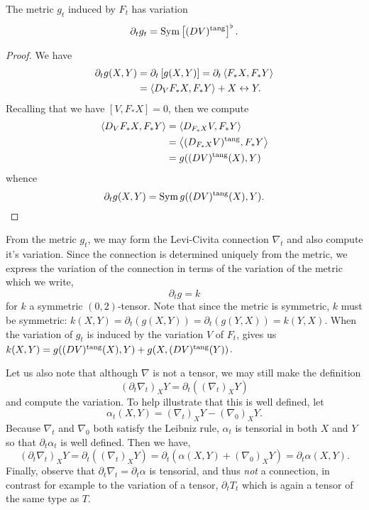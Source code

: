 \begin{lemma}
\label{lem:dt_g}
The metric \(g_t\) induced by \(F_t\) has variation
\[
\partial_t g_t = \operatorname{Sym} \left[(DV)^{\operatorname{tang}}\right]^{\flat}.
\]
\end{lemma}

\begin{proof}
We have
\[
\begin{split}
\partial_t g (X, Y) &= \partial_t \left[g(X, Y)\right] = \partial_t \left\langle F_{\ast} X,F_{\ast} Y \right\rangle \\
&= \left\langle D_V F_{\ast} X,F_{\ast} Y \right\rangle + X \leftrightarrow Y.
\end{split}
\]
Recalling that we have \([V, F_{\ast} X] = 0\), then we compute
\[
\begin{split}
\left\langle D_V F_{\ast} X,F_{\ast} Y \right\rangle &= \left\langle D_{F_{\ast} X} V,F_{\ast} Y \right\rangle \\
&= \left\langle (D_{F_{\ast} X} V)^{\operatorname{tang}},F_{\ast} Y \right\rangle \\
&= g((DV)^{\operatorname{tang}} (X), Y)
\end{split}
\]
whence
\[
\partial_t g (X, Y) = \operatorname{Sym} g((DV)^{\operatorname{tang}} (X), Y).
\]
\end{proof}

From the metric \(g_t\), we may form the Levi-Civita connection \(\nabla_t\) and also compute it's variation. Since the connection is determined uniquely from the metric, we express the variation of the connection in terms of the variation of the metric which we write,
\[
\partial_t g = k
\]
for \(k\) a symmetric \((0, 2)\)-tensor. Note that since the metric is symmetric, \(k\) must be symmetric: \(k(X, Y) = \partial_t (g(X, Y)) = \partial_t (g(Y, X)) = k(Y, X)\). When the variation of \(g_t\) is induced by the variation \(V\) of \(F_t\),  gives us \(k(X, Y) = g((DV)^{\operatorname{tang}} (X), Y) + g(X, (DV)^{\operatorname{tang}} (Y))\).

\begin{rem}
Let us also note that although \(\nabla\) is not a tensor, we may still make the definition
\[
(\partial_t \nabla_t)_X Y = \partial_t((\nabla_t)_X Y)
\]
and compute the variation. To help illustrate that this is well defined, let
\[
\alpha_t(X, Y) = (\nabla_{t})_X Y - (\nabla_{0})_X Y.
\]
Because \(\nabla_t\) and \(\nabla_0\) both satisfy the Leibniz rule, \(\alpha_t\) is tensorial in both \(X\) and \(Y\) so that \(\partial_t \alpha_t\) is well defined. Then we have,
\[
(\partial_t \nabla_t)_X Y = \partial_t((\nabla_t)_X Y) = \partial_t (\alpha(X, Y) + (\nabla_{0})_X Y) = \partial_t \alpha (X, Y).
\]
Finally, observe that \(\partial_t \nabla_t = \partial_t \alpha\) is tensorial, and thus \emph{not} a connection, in contrast for example to the variation of a tensor, \(\partial_t T_t\) which is again a tensor of the same type as \(T\).
\end{rem}

